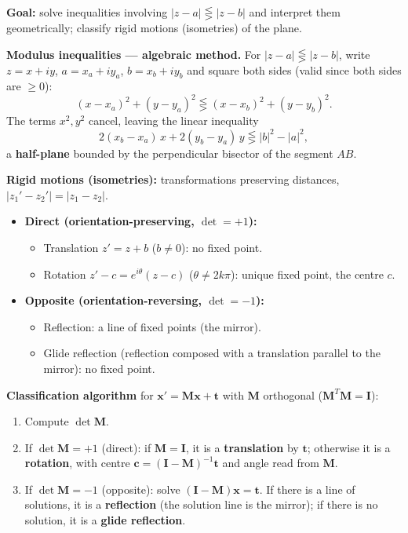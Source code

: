 \documentclass[11pt]{article}
\begin{document}
\begin{methode}
\textbf{Goal:} solve inequalities involving $|z-a| \lesseqgtr |z-b|$ and interpret them geometrically; classify rigid motions (isometries) of the plane.

\textbf{Modulus inequalities — algebraic method.} For $|z-a| \lesseqgtr |z-b|$, write $z=x+iy$, $a=x_a+iy_a$, $b=x_b+iy_b$ and square both sides (valid since both sides are $\ge 0$):
\[
(x-x_a)^2 + (y-y_a)^2 \lesseqgtr (x-x_b)^2 + (y-y_b)^2.
\]
The terms $x^2, y^2$ cancel, leaving the linear inequality
\[
2(x_b - x_a)\,x + 2(y_b - y_a)\,y \lesseqgtr |b|^2 - |a|^2,
\]
a \textbf{half-plane} bounded by the perpendicular bisector of the segment $AB$.

\textbf{Rigid motions (isometries):} transformations preserving distances, $|z_1' - z_2'| = |z_1 - z_2|$.
\begin{itemize}
    \item \textbf{Direct (orientation-preserving, $\det=+1$):}
        \begin{itemize}
            \item Translation $z' = z + b$ ($b \ne 0$): no fixed point.
            \item Rotation $z' - c = e^{i\theta}(z - c)$ ($\theta \ne 2k\pi$): unique fixed point, the centre $c$.
        \end{itemize}
    \item \textbf{Opposite (orientation-reversing, $\det=-1$):}
        \begin{itemize}
            \item Reflection: a line of fixed points (the mirror).
            \item Glide reflection (reflection composed with a translation parallel to the mirror): no fixed point.
        \end{itemize}
\end{itemize}

\textbf{Classification algorithm} for $\mathbf{x}' = \mathbf{M}\mathbf{x} + \mathbf{t}$ with $\mathbf{M}$ orthogonal ($\mathbf{M}^{T}\mathbf{M}=\mathbf{I}$):
\begin{enumerate}
    \item Compute $\det \mathbf{M}$.
    \item If $\det \mathbf{M} = +1$ (direct): if $\mathbf{M} = \mathbf{I}$, it is a \textbf{translation} by $\mathbf{t}$; otherwise it is a \textbf{rotation}, with centre $\mathbf{c} = (\mathbf{I}-\mathbf{M})^{-1}\mathbf{t}$ and angle read from $\mathbf{M}$.
    \item If $\det \mathbf{M} = -1$ (opposite): solve $(\mathbf{I}-\mathbf{M})\mathbf{x} = \mathbf{t}$. If there is a line of solutions, it is a \textbf{reflection} (the solution line is the mirror); if there is no solution, it is a \textbf{glide reflection}.
\end{enumerate}
\end{methode}
\end{document}
